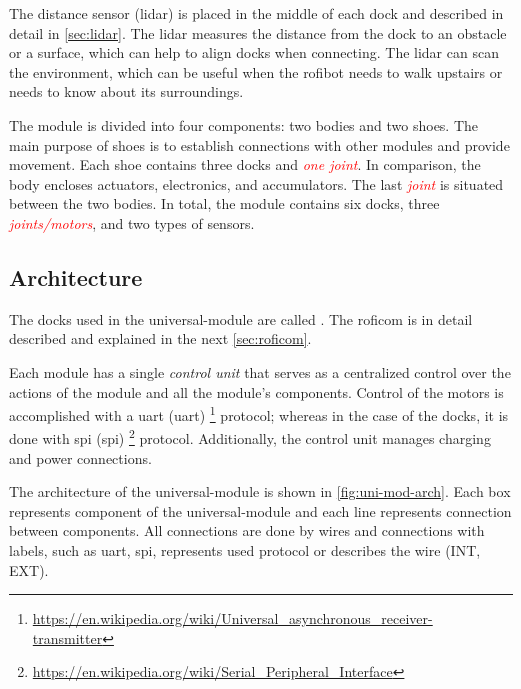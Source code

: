 \documentclass[
  digital,     %
  oneside,     %
  nosansbold,  %
  nocolorbold, %
  nolof,         %
  nolot,         %
]{fithesis4}
\newcommand{\TODO}[1]{\textcolor{red}{\textit{#1}}}
\begin{document}
The distance sensor (\acrshort{lidar}) is placed in the middle of each dock and described in detail in \autoref{sec:lidar}. The \acrshort{lidar} measures the distance from the dock to an obstacle or a surface, which can help to align docks when connecting. The \acrshort{lidar} can scan the environment, which can be useful when the \gls{rofibot} needs to walk upstairs or needs to know about its surroundings.

The module is divided into four components: two bodies and two shoes. The main purpose of shoes is to establish connections with other modules and provide movement. Each shoe contains three docks and \TODO{one joint}. In comparison, the body encloses actuators, electronics, and accumulators. The last \TODO{joint} is situated between the two bodies. In total, the module contains six docks, three \TODO{joints/motors}, and two types of sensors.


\subsection{ Architecture }

The docks used in the \gls{universal-module} are called . The \acrshort{roficom} is in detail described and explained in the next \autoref{sec:roficom}.

Each module has a single \emph{control unit} that serves as a centralized control over the actions of the module and all the module's components. Control of the motors is accomplished with a \acrshort{uart} (\acrlong{uart}) \footnote{\url{https://en.wikipedia.org/wiki/Universal_asynchronous_receiver-transmitter}} protocol; whereas in the case of the docks, it is done with \acrshort{spi} (\acrlong{spi}) \footnote{\url{https://en.wikipedia.org/wiki/Serial_Peripheral_Interface}} protocol. Additionally, the control unit manages charging and power connections.

The architecture of the \gls{universal-module} is shown in \autoref{fig:uni-mod-arch}. Each box represents component of the \gls{universal-module} and each line represents connection between components. All connections are done by wires and connections with labels, such as \acrshort{uart}, \acrshort{spi}, represents used protocol or describes the wire (INT, EXT). 
\end{document}
